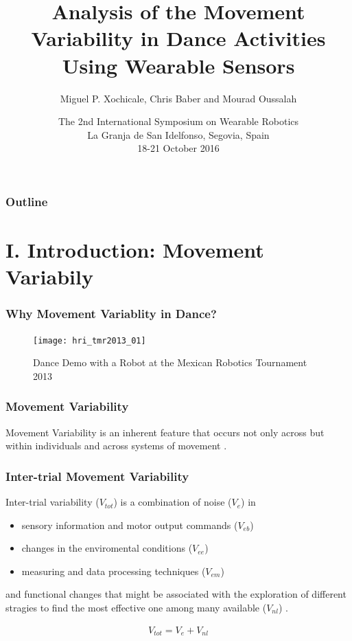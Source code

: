\documentclass{beamer}
\title[Analysis of the Movement Variability in Dance Activities Using Wearable Sensors]
{Analysis of the Movement Variability in Dance Activities Using Wearable Sensors}
\author[Miguel P. Xochicale]
{   %
    Miguel P. Xochicale\inst{1}, Chris Baber\inst{1} and Mourad Oussalah\inst{2}
}
\institute[CVC-IIIA]
{   %

      \vspace{5mm}
    \begin{tabular}{c}
    \inst{1} School of Electronic, Electrical and System Engineering, University of Birmingham, U.K. \\
    \inst{2} Center for Ubiquitous Computing, University of Oulu, Finland
    \end{tabular}
}
\date[DEMO-2013]
{   %
      \vspace{5mm}
     The 2nd International Symposium on Wearable Robotics \\
     La Granja de San Idelfonso, Segovia, Spain \\
     18-21 October 2016
}
\begin{document}
\frame{\titlepage}





\begin{frame}
\frametitle{Outline} 
\tableofcontents
\end{frame}




\section{I. Introduction: Movement Variabily}

\begin{frame}
  \frametitle{Why Movement Variablity in Dance?}

  
  \begin{figure}
 \texttt{[image: hri\_tmr2013\_01]}
\centering 
\caption{Dance Demo with a Robot at the Mexican Robotics Tournament 2013}
 \end{figure}
 
 
\end{frame}




 
 
 
\begin{frame}
\frametitle{Movement Variability}
 
Movement Variability is an inherent feature that occurs not only across but within individuals
and across systems of movement  \textcolor{red}{\textbf{ \cite{newell1993variability}   }}.
  
\end{frame}
 
\begin{frame}
\frametitle{Inter-trial Movement Variability}
 
Inter-trial variability ($V_{tot}$) is a combination of noise ($V_{e}$) in 
\begin{itemize}
    \item sensory information and motor output commands ($V_{eb}$)
    \item changes in the enviromental conditions ($V_{ee}$)
    \item measuring and data processing techniques ($V_{em}$)
\end{itemize}
and functional changes that might be associated with the exploration of different 
stragies to find the most effective one among many available ($V_{nl}$) 
\textcolor{red}{\textbf{  \cite{Preatoni2013}   }}.

\begin{eqnarray*} 
 V_{tot} = V_{e} + V_{nl}
\end{eqnarray*}


\end{frame}
 
\end{document}
